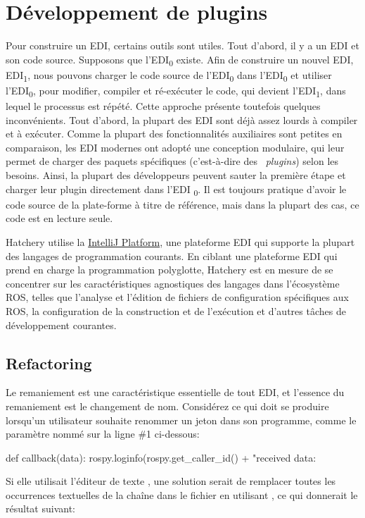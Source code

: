 \section{Développement de plugins}

Pour construire un EDI, certains outils sont utiles. Tout d'abord, il y a un EDI et son code source. Supposons que l'EDI\textsubscript{0} existe. Afin de construire un nouvel EDI, EDI\textsubscript{1}, nous pouvons charger le code source de l'EDI\textsubscript{0} dans l'EDI\textsubscript{0} et utiliser l'EDI\textsubscript{0}, pour modifier, compiler et ré-exécuter le code, qui devient l'EDI\textsubscript{1}, dans lequel le processus est répété. Cette approche présente toutefois quelques inconvénients. Tout d'abord, la plupart des EDI sont déjà assez lourds à compiler et à exécuter. Comme la plupart des fonctionnalités auxiliaires sont petites en comparaison, les EDI modernes ont adopté une conception modulaire, qui leur permet de charger des paquets spécifiques (c'est-à-dire des \ \textit{plugins}) selon les besoins. Ainsi, la plupart des développeurs peuvent sauter la première étape et charger leur plugin directement dans l'EDI \textsubscript{0}. Il est toujours pratique d'avoir le code source de la plate-forme à titre de référence, mais dans la plupart des cas, ce code est en lecture seule.

Hatchery utilise la \href{https://www.jetbrains.org/intellij/sdk/docs/}{IntelliJ Platform}, une plateforme EDI qui supporte la plupart des langages de programmation courants. En ciblant une plateforme EDI qui prend en charge la programmation polyglotte, Hatchery est en mesure de se concentrer sur les caractéristiques agnostiques des langages dans l'écosystème ROS, telles que l'analyse et l'édition de fichiers de configuration spécifiques aux ROS, la configuration de la construction et de l'exécution et d'autres tâches de développement courantes.

\subsection{Refactoring}\label{subsec:refactoring}

Le remaniement est une caractéristique essentielle de tout EDI, et l'essence du remaniement est le changement de nom. Considérez ce qui doit se produire lorsqu'un utilisateur souhaite renommer un jeton dans son programme, comme le paramètre nommé  sur la ligne \#1 ci-dessous:
%
\begin{pythonlisting}
def callback(data):
    rospy.loginfo(rospy.get_caller_id() + "received data: %
\end{pythonlisting}
%
Si elle utilisait l'éditeur de texte , une solution serait de remplacer toutes les occurrences textuelles de la chaîne  dans le fichier en utilisant , ce qui donnerait le résultat suivant:

